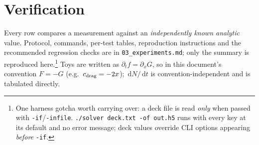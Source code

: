 \documentclass[10pt]{article}
\newcommand{\code}[1]{\texttt{#1}}
\newcommand{\dd}{\,\mathrm{d}}
\begin{document}
\section{Verification}
\label{sec:verify}

Every row compares a measurement against an \emph{independently known analytic}
value. Protocol, commands, per-test tables, reproduction instructions and the
recommended regression checks are in \code{03\_experiments.md}; only the summary
is reproduced here.\footnote{One harness gotcha worth carrying over: a deck file
is read \emph{only} when passed with \code{-if}/\code{-infile}.
\code{./solver deck.txt -of out.h5} runs with every key at its default and no
error message; deck values override CLI options appearing \emph{before}
\code{-if}.} Toys are written as $\partial_tf=\partial_xG$, so in this document's
convention $F=-G$ (e.g.\ $c_{\rm drag}=-2x$); $\dd N/\dd t$ is
convention-independent and is tabulated directly.
\end{document}
